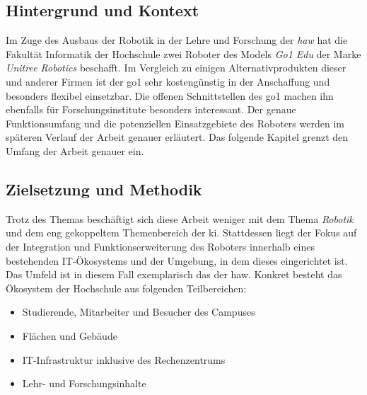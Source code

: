 \subsection{Hintergrund und Kontext}\label{subsec:hintergrund-und-kontext}

Im Zuge des Ausbaus der Robotik in der Lehre und Forschung der \emph{\gls{haw}} hat
die Fakultät Informatik der Hochschule zwei Roboter des Models \emph{Go1 Edu} der Marke \emph{Unitree Robotics} beschafft.
Im Vergleich zu einigen Alternativprodukten dieser und anderer Firmen ist der \gls{go1} sehr kostengünstig in der Anschaffung und besonders flexibel einsetzbar.
Die offenen Schnittstellen des \gls{go1} machen ihn ebenfalls für Forschungsinstitute besonders interessant.
Der genaue Funktionsumfang und die potenziellen Einsatzgebiete des Roboters werden im späteren Verlauf der Arbeit genauer erläutert.
Das folgende Kapitel grenzt den Umfang der Arbeit genauer ein.

\subsection{Zielsetzung und Methodik}
\label{subsec:zielsetzung-und-methodik}



Trotz des Themas \emph{\mytitle} beschäftigt sich diese Arbeit weniger mit dem Thema \emph{Robotik} und
dem eng gekoppeltem Themenbereich der \gls{ki}.
Stattdessen liegt der Fokus auf der Integration und Funktionserweiterung des Roboters innerhalb eines
bestehenden IT-Ökosystems und der Umgebung, in dem dieses eingerichtet ist.
Das Umfeld ist in diesem Fall exemplarisch das der \gls{haw}.
Konkret besteht das Ökosystem der Hochschule aus folgenden Teilbereichen:

\begin{itemize}
    \item Studierende, Mitarbeiter und Besucher des Campuses
    \item Flächen und Gebäude
    \item IT-Infrastruktur inklusive des Rechenzentrums
    \item Lehr- und Forschungsinhalte
\end{itemize}

